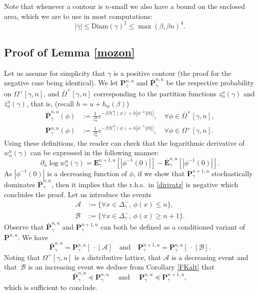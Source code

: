 \documentclass[JEP,XML,SOM,Unicode, NoFloatCountersInSection]{cedram}
\let\mathcal\mathscr
\numberwithin{equation}{section}
\theoremstyle{plain}
\theoremstyle{definition}
\newcommand{\Diam}{\mathrm{Diam}}
\newcommand{\cA}{{\ensuremath{\mathcal A}} }
\newcommand{\cB}{{\ensuremath{\mathcal B}} }
\newcommand{\cH}{{\ensuremath{\mathcal H}} }
\newcommand{\bP}{{\ensuremath{\mathbf P}} }
\newcommand{\bE}{{\ensuremath{\mathbf E}} }
\newcommand{\gb}{\beta}
\newcommand{\gO}{\Omega}
\newcommand{\ldom}{\preccurlyeq}
\begin{document}
Note that whenever a contour is $n$-small we also have a bound on the enclosed area, which we are to use in most computations:
\begin{equation}\label{areabound}
|\bar \gamma| \le \Diam(\gamma)^2\le \max(\gb,\gb n)^4.
\end{equation}

\subsection{Proof of Lemma \ref{mozon}}\label{mooz}
Let us assume for simplicity that $\gamma$ is a positive contour (the proof for the negative case being identical).
We let $\bP^{n,u}_{\gamma}$ and $\bar \bP^{n,u}_{\gamma}$ be the respective probability on $\gO^+[\gamma,n]$, and $\bar \gO^+[\gamma,n]$ corresponding to the partition functions
$z^u_n(\gamma)$ and $\bar z^u_n(\gamma)$, that is, (recall $h=u+h_w(\gb)$)
\begin{equation}\label{defpnu}
\begin{split}
\bar \bP^{n,u}_{\gamma}(\phi)&:=\frac{1}{z^u_n} e^{-\gb \cH^n_{\bar \gamma}(\phi)+h |\phi^{-1}\{0\}|}, \quad \forall \phi \in \bar \gO^+[\gamma,n],\\
\bP^{n,u}_{\gamma}(\phi)&:=\frac{1}{z^u_n} e^{-\gb \cH^n_{\bar \gamma}(\phi)+h |\phi^{-1}\{0\}|}, \quad \forall \phi \in \gO^+[\gamma,n].
\end{split}
\end{equation}
Using these definitions, the reader can check that the logarithmic derivative of $w^u_n(\gamma)$ can be expressed in the following manner:
\begin{equation}\label{dirivatz}
\partial_u \log w^u_n(\gamma)= \bE^{n+1,u}_{\gamma} [ |\phi^{-1}(0)|]- \bar \bE^{n,u}_{\gamma} [|\phi^{-1}(0)|].
\end{equation}
As $|\phi^{-1}(0)|$ is a decreasing function of $\phi$,
if we show that $\bP^{n+1,u}_{\gamma}$ stochastically dominates $\bar \bP^{n,u}_{\gamma}$, then it implies that the r.h.s.\ in
\eqref{dirivatz} is negative which concludes the proof.
Let us introduce the events
\begin{equation*}
\begin{split}
\cA&:= \{ \forall x\in \Delta^-_{\gamma},\ \phi(x)\le n\},\\
\cB&:= \{ \forall x\in \Delta^-_{\gamma}, \ \phi(x)\ge n+1\}.
\end{split}
\end{equation*}
Observe that $\bar \bP^{n,u}_{\gamma}$ and $\bP^{n+1,u}_{\gamma}$ can both be defined as a conditioned variant of $\bP^{n,u}$. We have
\begin{equation*}
\bar \bP^{n,u}_{\gamma}=\bP^{n,u}_{\gamma}[ \ \cdot \ | \ \cA ] \quad\text{and}\quad \bP^{n+1,u}_{\gamma}=\bP^{n,u}_{\gamma}[ \ \cdot \ | \ \cB ].
\end{equation*}
Noting that $\gO^+[\gamma,n]$ is a distributive lattice, that $\cA$ is a decreasing event and that~$\cB$ is an increasing event we deduce from Corollary \ref{FKalt} that
\begin{equation*}
\bar \bP^{n,u}_{\gamma} \ldom \bP^{n,u}_{\gamma}\quad \text{ and } \quad \bP^{n,u}_{\gamma}\ldom \bP^{n+1,u}_{\gamma},
\end{equation*}
which is sufficient to conclude.
\end{document}
